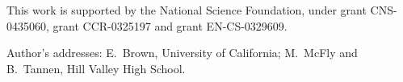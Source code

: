 This work is supported by the National Science Foundation, under grant CNS-0435060, grant CCR-0325197 and grant EN-CS-0329609.

Author's addresses: E.\ Brown, University of California; M.\ McFly {and} B.\ Tannen, Hill Valley High School.
